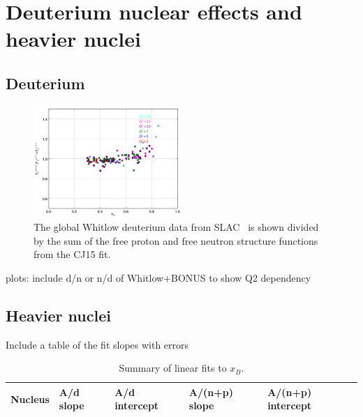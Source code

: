 \documentclass[oneside]{article}
\begin{document}
 
\section{Deuterium nuclear effects and heavier nuclei}

\subsection{Deuterium}

\begin{figure}[H]
  \centering
      	  \includegraphics[width=0.5\textwidth]{plots/deuterium_q2.png}
 	 \caption[Deuterium data from SLAC]{The global Whitlow deuterium data from SLAC~\cite{XS_d} is shown divided by the sum of the free proton and free neutron structure functions from the CJ15 fit.}
  \label{fig:d2_q2}
 \end{figure}

plots: include d/n or n/d of Whitlow+BONUS to show Q2 dependency

\subsection{Heavier nuclei}

Include a table of the fit slopes with errors
\begin{table}[htb!]
\caption{\label{SlopeFits} Summary of linear fits to $x_B$.}
\centering
\begin{tabular}{ | C{2.5cm} | C{2cm} | C{2cm} | C{2cm} | C{2cm} | }
 \hline
 \textbf{Nucleus} & \textbf{A/d slope} & \textbf{A/d intercept} & \textbf{A/(n+p) slope} & \textbf{A/(n+p) intercept} \\ 
  \hline
  \hline
    \end{tabular}
\end{table} 
\end{document}
